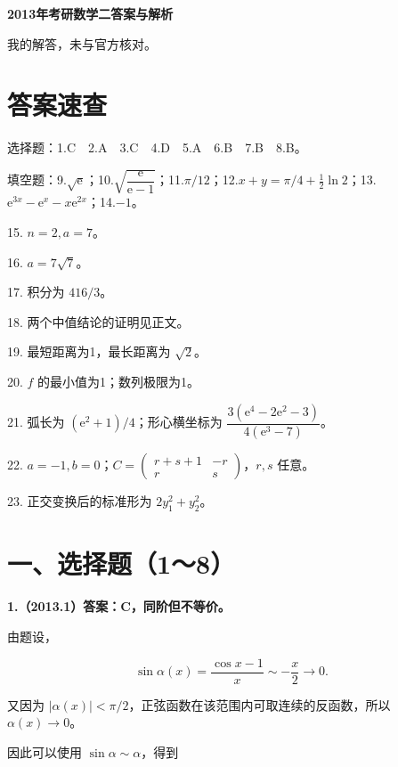 \documentclass[UTF8,11pt,fontset=windows]{ctexart}
\begin{document}
{\LARGE\bfseries 2013年考研数学二答案与解析\par}\vspace{6pt}

\begingroup\color{gray}我的解答，未与官方核对。\par\endgroup

\section*{答案速查}

\begingroup\color{gray}选择题：1.C　2.A　3.C　4.D　5.A　6.B　7.B　8.B。\par\endgroup

\begingroup\color{gray}填空题：9.$\sqrt{\mathrm e}$；10.$\sqrt{\dfrac{\mathrm e}{\mathrm e-1}}$；11.$\pi/12$；12.$x+y=\pi/4+\tfrac12\ln2$；13.$\mathrm e^{3x}-\mathrm e^x-x\mathrm e^{2x}$；14.$-1$。\par\endgroup

15. $n=2,a=7$。

16. $a=7\sqrt7$。

17. 积分为 $416/3$。

18. 两个中值结论的证明见正文。

19. 最短距离为1，最长距离为 $\sqrt2$。

20. $f$ 的最小值为1；数列极限为1。

21. 弧长为 $(\mathrm e^2+1)/4$；形心横坐标为 $\dfrac{3(\mathrm e^4-2\mathrm e^2-3)}{4(\mathrm e^3-7)}$。

22. $a=-1,b=0$；$C=\begin{pmatrix}r+s+1&-r\\r&s\end{pmatrix}$，$r,s$ 任意。

23. 正交变换后的标准形为 $2y_1^2+y_2^2$。

\clearpage

\section*{一、选择题（1～8）}

\textbf{1.（2013.1）答案：C，同阶但不等价。}

由题设，

$$
\sin\alpha(x)=\frac{\cos x-1}{x}\sim-\frac x2\longrightarrow0.
$$

又因为 $|\alpha(x)|<\pi/2$，正弦函数在该范围内可取连续的反函数，所以 $\alpha(x)\to0$。

因此可以使用 $\sin\alpha\sim\alpha$，得到
\end{document}
